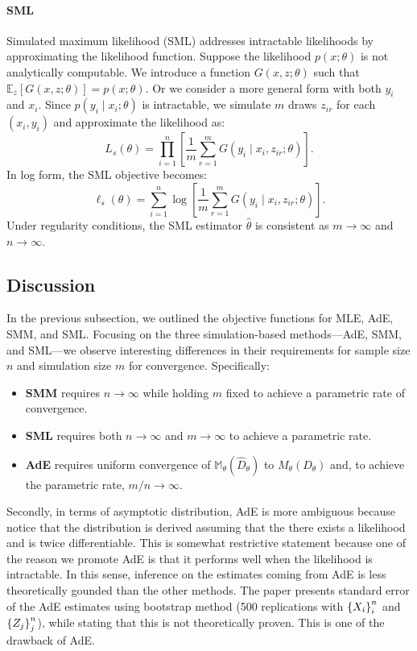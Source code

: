 \documentclass[12pt]{article}
\begin{document}
\paragraph{SML}
Simulated maximum likelihood (SML) addresses intractable likelihoods by
approximating the likelihood function. Suppose the likelihood \(p(x; \theta)\)
is not analytically computable. We introduce a function \(G(x, z; \theta)\)
such that \(\mathbb{E}_z[G(x, z; \theta)] = p(x; \theta)\). Or we consider a
more general form with both $y_i$ and $x_i$. Since \(p(y_i \mid x_i; \theta)\)
is intractable, we simulate \(m\) draws \(z_{ir}\) for each \((x_i, y_i)\) and
approximate the likelihood as:
\begin{equation*}
    L_s(\theta) = \prod_{i=1}^n \left[\frac{1}{m} \sum_{r=1}^m G(y_i \mid x_i, z_{ir}; \theta)\right].
\end{equation*}
In log form, the SML objective becomes:
\begin{equation*}
    \ell_s(\theta) = \sum_{i=1}^n \log \left[\frac{1}{m} \sum_{r=1}^m G(y_i \mid x_i, z_{ir}; \theta)\right].
\end{equation*}
Under regularity conditions, the SML estimator \(\hat{\theta}\) is consistent as \(m \to \infty\) and \(n \to \infty\).

\subsection{Discussion} \label{subsec:discussion}

In the previous subsection, we outlined the objective functions for MLE, AdE,
SMM, and SML. Focusing on the three simulation-based methods—AdE, SMM, and
SML—we observe interesting differences in their requirements for sample size
\(n\) and simulation size \(m\) for convergence. Specifically:

\begin{itemize}
    \item \textbf{SMM} requires \(n \to \infty\) while holding \(m\) fixed to achieve a parametric rate of convergence.
    \item \textbf{SML} requires both \(n \to \infty\) and \(m \to \infty\) to achieve a parametric rate.
    \item \textbf{AdE} requires uniform convergence of \(\mathbb{M}_\theta(\hat{D}_\theta)\) to \(M_\theta(D_\theta)\) and, to achieve the parametric rate, \(m/n \to \infty\).
\end{itemize}

Secondly, in terms of asymptotic distribution, AdE is more ambiguous because
notice that the distribution is derived assuming that the there exists a
likelihood and is twice differentiable. This is somewhat restrictive statement
because one of the reason we promote AdE is that it performs well when the
likelihood is intractable. In this sense, inference on the estimates coming
from AdE is less theoretically gounded than the other methods. The paper
presents standard error of the AdE estimates using bootstrap method (500
replications with $\left\{X_i\right\}_i^n$ and $\left\{Z_j\right\}_j^n$), while stating that this
is not theoretically proven. This is one of the drawback of AdE.
\end{document}
